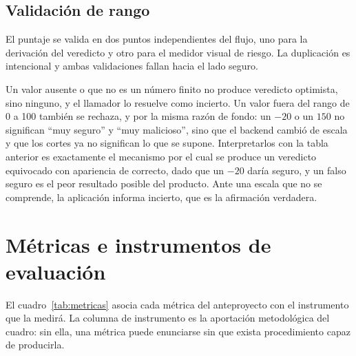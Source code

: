 \subsection{Validación de rango}

El puntaje se valida en dos puntos independientes del flujo, uno para la derivación del
veredicto y otro para el medidor visual de riesgo. La duplicación es intencional y
ambas validaciones fallan hacia el lado seguro.

Un valor ausente o que no es un número finito no produce veredicto optimista, sino
ninguno, y el llamador lo resuelve como incierto. Un valor fuera del rango de 0 a 100
también se rechaza, y por la misma razón de fondo: un $-20$ o un $150$ no significan
``muy seguro'' y ``muy malicioso'', sino que el backend cambió de escala y que los
cortes ya no significan lo que se supone. Interpretarlos con la tabla anterior es
exactamente el mecanismo por el cual se produce un veredicto equivocado con apariencia
de correcto, dado que un $-20$ daría seguro, y un falso seguro es el peor resultado
posible del producto. Ante una escala que no se comprende, la aplicación informa
incierto, que es la afirmación verdadera.

\section{Métricas e instrumentos de evaluación}

El cuadro~\ref{tab:metricas} asocia cada métrica del anteproyecto con el instrumento
que la medirá. La columna de instrumento es la aportación metodológica del cuadro: sin
ella, una métrica puede enunciarse sin que exista procedimiento capaz de producirla.

